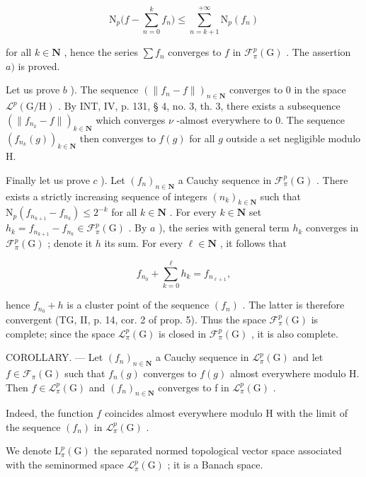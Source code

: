 \[
\mathrm{N} _ {p} \Big (f - \sum_ {n = 0} ^ {k} f _ {n} \Big) \leqslant \sum_ {n = k + 1} ^ {+ \infty} \mathrm{N} _ {p} (f _ {n})
\]

for all \(k \in \mathbf{N}\) , hence the series \(\sum f_n\) converges to \(f\) in \(\mathcal{F}_{\pi}^{p}(\mathrm{G})\) . The assertion \(a)\) is proved.

Let us prove \(b\) ). The sequence \((\|f_n - f\|)_{n \in \mathbf{N}}\) converges to 0 in the space \(\mathcal{L}^p(\mathrm{G}/\mathrm{H})\) . By INT, IV, p. 131, § 4, no. 3, th. 3, there exists a subsequence \((\|f_{n_k} - f\|)_{k \in \mathbf{N}}\) which converges \(\nu\) -almost everywhere to 0. The sequence \((f_{n_k}(g))_{k \in \mathbf{N}}\) then converges to \(f(g)\) for all \(g\) outside a set negligible modulo H.

Finally let us prove \(c\) ). Let \((f_n)_{n \in \mathbf{N}}\) a Cauchy sequence in \(\mathcal{F}_\pi^p(\mathrm{G})\) . There exists a strictly increasing sequence of integers \((n_k)_{k \in \mathbf{N}}\) such that \(\mathrm{N}_p(f_{n_{k+1}} - f_{n_k}) \leqslant 2^{-k}\) for all \(k \in \mathbf{N}\) . For every \(k \in \mathbf{N}\) set \(h_k = f_{n_{k+1}} - f_{n_k} \in \mathcal{F}_\pi^p(\mathrm{G})\) . By \(a\) ), the series with general term \(h_k\) converges in \(\mathcal{F}_\pi^p(\mathrm{G})\) ; denote it \(h\) its sum. For every \(\ell \in \mathbf{N}\) , it follows that

\[
f _ {n _ {0}} + \sum_ {k = 0} ^ {\ell} h _ {k} = f _ {n _ {\ell + 1}},
\]

hence \(f_{n_{0}} + h\) is a cluster point of the sequence \((f_{n})\) . The latter is therefore convergent (TG, II, p. 14, cor. 2 of prop. 5). Thus the space \(\mathcal{F}_{\pi}^{p}(\mathrm{G})\) is complete; since the space \(\mathcal{L}_{\pi}^{p}(\mathrm{G})\) is closed in \(\mathcal{F}_{\pi}^{p}(\mathrm{G})\) , it is also complete.

COROLLARY. --- Let \((f_{n})_{n\in\mathbf{N}}\) a Cauchy sequence in \(\mathcal{L}_{\pi}^{p}(\mathrm{G})\) and let \(f\in\mathcal{F}_{\pi}(\mathrm{G})\) such that \(f_{n}(g)\) converges to \(f(g)\) almost everywhere modulo H. Then \(f\in\mathcal{L}_{\pi}^{p}(\mathrm{G})\) and \((f_{n})_{n\in\mathbf{N}}\) converges to f in \(\mathcal{L}_{\pi}^{p}(\mathrm{G})\) .

Indeed, the function \(f\) coincides almost everywhere modulo H with the limit of the sequence \((f_n)\) in \(\mathcal{L}_{\pi}^{p}(\mathrm{G})\) .

We denote \(\mathrm{L}_{\pi}^{p}(\mathrm{G})\) the separated normed topological vector space associated with the seminormed space \(\mathcal{L}_{\pi}^{p}(\mathrm{G})\) ; it is a Banach space.

